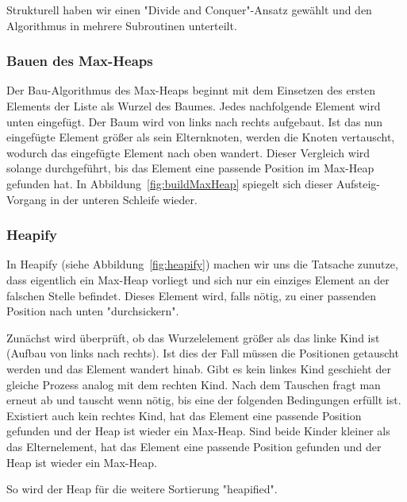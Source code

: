 \documentclass[11pt]{article}
\begin{document}
    Strukturell haben wir einen "Divide and Conquer"-Ansatz gewählt und den
    Algorithmus in mehrere Subroutinen unterteilt.

    \subsubsection{Bauen des Max-Heaps}
    Der Bau-Algorithmus des Max-Heaps beginnt mit dem Einsetzen des ersten
    Elements der Liste als Wurzel des Baumes.
    Jedes nachfolgende Element wird unten eingefügt. Der Baum wird von links
    nach rechts aufgebaut.
    Ist das nun eingefügte Element größer als sein Elternknoten, werden die
    Knoten vertauscht, wodurch das eingefügte Element nach oben wandert.
    Dieser Vergleich wird solange durchgeführt, bis das Element eine passende
    Position im Max-Heap gefunden hat.
    In Abbildung~\ref{fig:buildMaxHeap} spiegelt sich dieser Aufsteig-Vorgang
    in der unteren Schleife wieder.

    \subsubsection{Heapify}
    In Heapify (siehe Abbildung~\ref{fig:heapify}) machen wir uns die
    Tatsache zunutze, dass eigentlich ein
    Max-Heap vorliegt und sich nur ein einziges Element an der falschen
    Stelle befindet.
    Dieses Element wird, falls nötig, zu einer passenden Position nach unten
    "durchsickern".

    Zunächst wird überprüft, ob das Wurzelelement größer als das linke Kind
    ist (Aufbau von links nach rechts).
    Ist dies der Fall müssen die Positionen getauscht werden und das Element
    wandert hinab.
    Gibt es kein linkes Kind geschieht der gleiche Prozess analog mit dem
    rechten Kind.
    Nach dem Tauschen fragt man erneut ab und tauscht wenn nötig, bis eine
    der folgenden Bedingungen erfüllt ist.
    Existiert auch kein rechtes Kind, hat das Element eine passende Position
    gefunden und der Heap ist wieder ein Max-Heap.
    Sind beide Kinder kleiner als das Elternelement, hat das Element eine
    passende Position gefunden und der Heap ist wieder ein Max-Heap.

    So wird der Heap für die weitere Sortierung "heapified".
\end{document}
